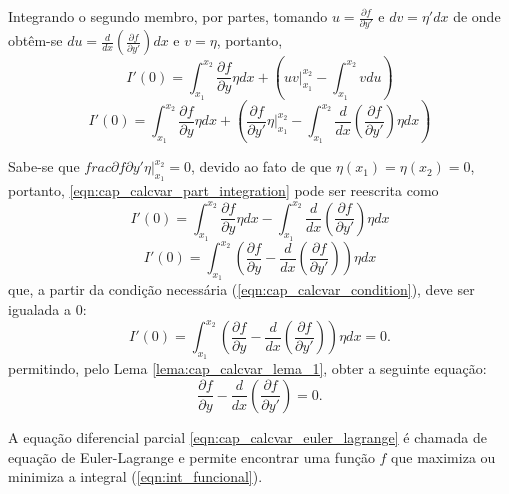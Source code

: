 Integrando o segundo membro, por partes, tomando $u=\frac{\partial f}{\partial y'}$ e $dv=\eta'dx$ de onde obtêm-se $du=\frac{d}{dx}\left ( \frac{\partial f}{\partial y'} \right )dx$ e $v=\eta$, portanto,
$$
I'(0)=
	\int_{x_1}^{x_2} \frac{\partial f}{\partial y}\eta dx
	+
	\left (
	uv \Big|_{x_1}^{x_2} - \int_{x_1}^{x_2}vdu
	\right )
$$
\begin{equation}\label{eqn:cap_calcvar_part_integration}
I'(0)=
	\int_{x_1}^{x_2} \frac{\partial f}{\partial y}\eta dx
	+
	\left (
		\frac{\partial f}{\partial y'}\eta \Biggr|_{x_1}^{x_2} - \int_{x_1}^{x_2} \frac{d}{dx}\left ( \frac{\partial f}{\partial y'} \right ) \eta dx
	\right )
\end{equation}

Sabe-se que $frac{\partial f}{\partial y'}\eta \Big |_{x_1}^{x_2}=0$, devido ao fato de que $\eta(x_1)=\eta(x_2)=0$, portanto, \eqref{eqn:cap_calcvar_part_integration} pode ser reescrita como
$$
I'(0)=
	\int_{x_1}^{x_2} \frac{\partial f}{\partial y}\eta dx
	-
	\int_{x_1}^{x_2} \frac{d}{dx} \left ( \frac{\partial f}{\partial y'} \right ) \eta dx
$$
$$
I'(0)=\int_{x_1}^{x_2}\left (
	\frac{\partial f}{\partial y} -
	\frac{d}{dx}
	\left (
		\frac{\partial f}{\partial y'}
	\right )
\right )\eta dx
$$
que, a partir da condição necessária (\ref{eqn:cap_calcvar_condition}), deve ser igualada a $0$:
$$
I'(0)=\int_{x_1}^{x_2}\left (
	\frac{\partial f}{\partial y} -
	\frac{d}{dx}
	\left (
		\frac{\partial f}{\partial y'}
	\right )
\right )\eta dx = 0	\text{.}
$$
permitindo, pelo Lema \ref{lema:cap_calcvar_lema_1}, obter a seguinte equação:
\begin{equation}\label{eqn:cap_calcvar_euler_lagrange}
\frac{\partial f}{\partial y} - \frac{d}{dx} \left ( \frac{\partial f}{\partial y'} \right )=0 \text{.}
\end{equation}

A equação diferencial parcial \eqref{eqn:cap_calcvar_euler_lagrange} é chamada de equação de Euler-Lagrange e permite encontrar uma função $f$ que maximiza ou minimiza a integral (\ref{eqn:int_funcional}).



